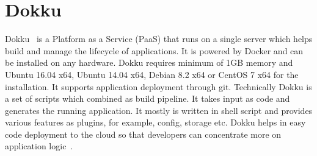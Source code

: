 \section{Dokku}
Dokku~\cite{hid-sp18-402-www-dokku} is a Platform as a Service (PaaS)
that runs on a single server which helps build and manage the
lifecycle of applications. It is powered by Docker and can be
installed on any hardware. Dokku requires minimum of 1GB memory and
Ubuntu 16.04 x64, Ubuntu 14.04 x64, Debian 8.2 x64 or CentOS 7 x64 for
the installation. It supports application deployment through
git. Technically Dokku is a set of scripts which combined as build
pipeline. It takes input as code and generates the running application. It
mostly is written in shell script and provides various features as
plugins, for example, config, storage etc. Dokku helps in easy code
deployment to the cloud so that developers can concentrate more on
application logic~\cite{hid-sp18-402-www-dokkuG}.
